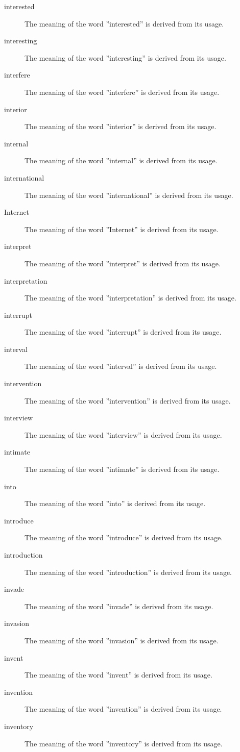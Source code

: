 \documentclass[12pt, letterpaper]{memoir}
\begin{document}
\begin{description}
\item[interested] The meaning of the word ''interested'' is derived from its usage.
\item[interesting] The meaning of the word ''interesting'' is derived from its usage.
\item[interfere] The meaning of the word ''interfere'' is derived from its usage.
\item[interior] The meaning of the word ''interior'' is derived from its usage.
\item[internal] The meaning of the word ''internal'' is derived from its usage.
\item[international] The meaning of the word ''international'' is derived from its usage.
\item[Internet] The meaning of the word ''Internet'' is derived from its usage.
\item[interpret] The meaning of the word ''interpret'' is derived from its usage.
\item[interpretation] The meaning of the word ''interpretation'' is derived from its usage.
\item[interrupt] The meaning of the word ''interrupt'' is derived from its usage.
\item[interval] The meaning of the word ''interval'' is derived from its usage.
\item[intervention] The meaning of the word ''intervention'' is derived from its usage.
\item[interview] The meaning of the word ''interview'' is derived from its usage.
\item[intimate] The meaning of the word ''intimate'' is derived from its usage.
\item[into] The meaning of the word ''into'' is derived from its usage.
\item[introduce] The meaning of the word ''introduce'' is derived from its usage.
\item[introduction] The meaning of the word ''introduction'' is derived from its usage.
\item[invade] The meaning of the word ''invade'' is derived from its usage.
\item[invasion] The meaning of the word ''invasion'' is derived from its usage.
\item[invent] The meaning of the word ''invent'' is derived from its usage.
\item[invention] The meaning of the word ''invention'' is derived from its usage.
\item[inventory] The meaning of the word ''inventory'' is derived from its usage.

\end{description}
\end{document}
